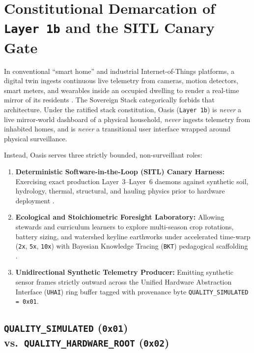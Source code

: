 \section{Constitutional Demarcation of \texttt{Layer 1b} and the SITL Canary Gate}
\label{sec:oasis-constitutional-demarcation}

In conventional ``smart home'' and industrial Internet-of-Things platforms, a digital twin ingests continuous live telemetry from cameras, motion detectors, smart meters, and wearables inside an occupied dwelling to render a real-time mirror of its residents \parencite{zuboff2019}. The Sovereign Stack categorically forbids that architecture. Under the ratified stack constitution, Oasis (\texttt{Layer 1b}) is \emph{never} a live mirror-world dashboard of a physical household, \emph{never} ingests telemetry from inhabited homes, and is \emph{never} a transitional user interface wrapped around physical surveillance.

Instead, Oasis serves three strictly bounded, non-surveillant roles:
\begin{enumerate}
  \item \textbf{Deterministic Software-in-the-Loop (SITL) Canary Harness:} Exercising exact production Layer~3--Layer~6 daemons against synthetic soil, hydrology, thermal, structural, and hauling physics prior to hardware deployment \parencite{grieves2014digital}.
  \item \textbf{Ecological and Stoichiometric Foresight Laboratory:} Allowing stewards and curriculum learners to explore multi-season crop rotations, battery sizing, and watershed keyline earthworks under accelerated time-warp (\texttt{2x}, \texttt{5x}, \texttt{10x}) with Bayesian Knowledge Tracing (\texttt{BKT}) pedagogical scaffolding \parencite{corbett1995bkt,forrester1961}.
  \item \textbf{Unidirectional Synthetic Telemetry Producer:} Emitting synthetic sensor frames strictly outward across the Unified Hardware Abstraction Interface (\texttt{UHAI}) ring buffer tagged with provenance byte \texttt{QUALITY\_SIMULATED = 0x01}.
\end{enumerate}

\subsection{\texttt{QUALITY\_SIMULATED} (\texttt{0x01}) vs.\ \texttt{QUALITY\_HARDWARE\_ROOT} (\texttt{0x02})}

